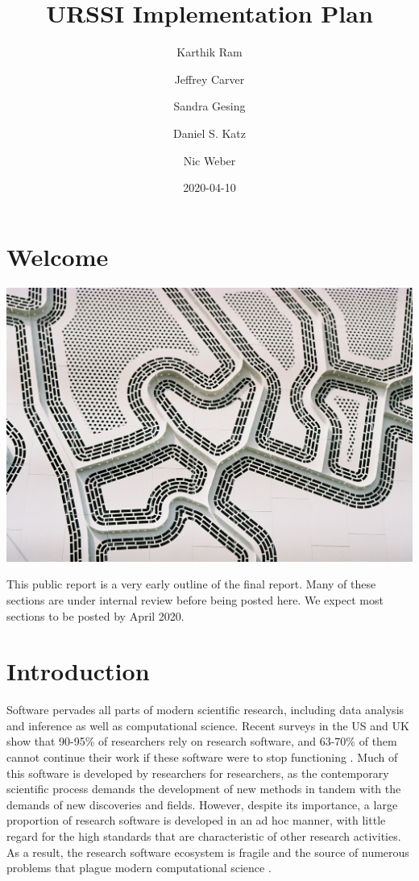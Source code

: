 \documentclass[
]{book}
\title{URSSI Implementation Plan}
\author{Karthik Ram \and Jeffrey Carver \and Sandra Gesing \and Daniel S. Katz \and Nic Weber}
\date{2020-04-10}
\begin{document}
\maketitle

{
\setcounter{tocdepth}{1}
\tableofcontents
}
\hypertarget{welcome}{%
\chapter*{Welcome}\label{welcome}}

\includegraphics{images/plan.jpg}

This public report is a very early outline of the final report. Many of these sections are under internal review before being posted here. We expect most sections to be posted by April 2020.

\hypertarget{intro}{%
\chapter{Introduction}\label{intro}}

Software pervades all parts of modern scientific research, including data analysis and inference
as well as computational science. Recent surveys in the US and UK show that 90-95\% of researchers
rely on research software, and 63-70\% of them cannot continue their work if these software were
to stop functioning \citep{hettrick2014}. Much of this software is developed by researchers for
researchers, as the contemporary scientific process demands the development of new methods in
tandem with the demands of new discoveries and fields. However, despite its importance, a large
proportion of research software is developed in an ad hoc manner, with little regard for the
high standards that are characteristic of other research activities. As a result, the research
software ecosystem is fragile and the source of numerous problems that plague modern
computational science \citep{carver2018conceptualization}.
\end{document}
